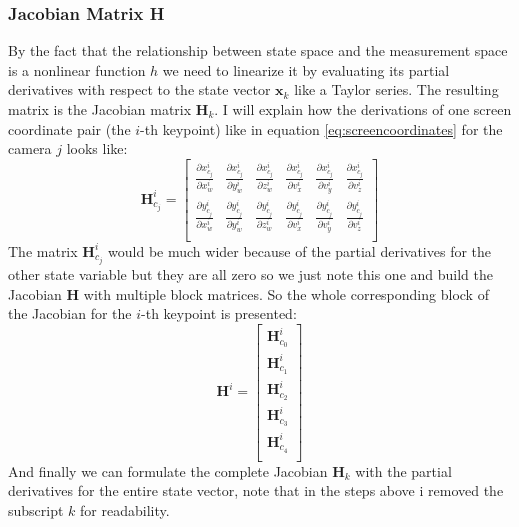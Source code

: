 \subsubsection{Jacobian Matrix H} \label{sec:jacobian}
By the fact that the relationship between state space and the measurement space is a nonlinear function $h$ we need to linearize it by evaluating its partial derivatives with respect to the state vector $\mathbf{x}_k$ like a Taylor series. The resulting matrix is the Jacobian matrix $\mathbf{H}_k$. I will explain how the derivations of one screen coordinate pair (the $i$-th keypoint) like in equation \ref{eq:screencoordinates} for the camera $j$ looks like:
\begin{equation}\label{eq:partial}
\mathbf{H}_{c_j}^i = 
\begin{bmatrix}
\frac{\partial x^i_{c_j}}{\partial x^i_w} & \frac{\partial x^i_{c_j}}{\partial y^i_w} & \frac{\partial x^i_{c_j}}{\partial z^i_w} & \frac{\partial x^i_{c_j}}{\partial v^i_x} & \frac{\partial x^i_{c_j}}{\partial v^i_y} & \frac{\partial x^i_{c_j}}{\partial v^i_z} \\
\frac{\partial y^i_{c_j}}{\partial x^i_w} & \frac{\partial y^i_{c_j}}{\partial y^i_w} & \frac{\partial y^i_{c_j}}{\partial z^i_w} & \frac{\partial y^i_{c_j}}{\partial v^i_x} & \frac{\partial y^i_{c_j}}{\partial v^i_y} & \frac{\partial y^i_{c_j}}{\partial v^i_z} \\
\end{bmatrix}
\end{equation}
The matrix $\mathbf{H}_{c_j}^i$ would be much wider because of the partial derivatives for the other state variable but they are all zero so we just note this one and build the Jacobian $\mathbf{H}$ with multiple block matrices. So the whole corresponding block of the Jacobian for the $i$-th keypoint is presented:
\begin{equation}
\mathbf{H}^i =
\begin{bmatrix}
\mathbf{H}_{c_0}^i \\
\mathbf{H}_{c_1}^i \\
\mathbf{H}_{c_2}^i \\
\mathbf{H}_{c_3}^i \\
\mathbf{H}_{c_4}^i \\
\end{bmatrix}
\end{equation}
And finally we can formulate the complete Jacobian $\mathbf{H}_k$ with the partial derivatives for the entire state vector, note that in the steps above i removed the subscript $k$ for readability.
